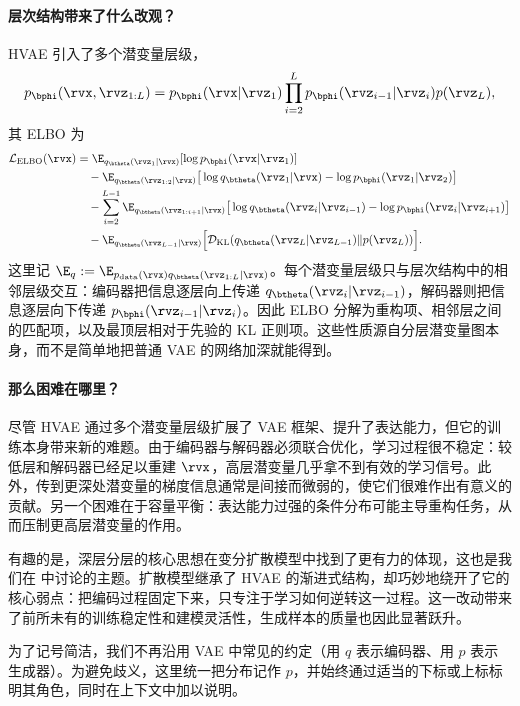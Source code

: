 \paragraph{层次结构带来了什么改观？}
HVAE 引入了多个潜变量层级，
\[
p_\bphi(\rvx,\rvz_{1:L})=p_\bphi(\rvx|\rvz_1)\prod_{i=2}^L p_\bphi(\rvz_{i-1}|\rvz_i) p(\rvz_L),
\]
其 ELBO 为
\begin{align*}
\mathcal L_{\mathrm{ELBO}}(\rvx)
&= \E_{q_\btheta(\rvz_1|\rvx)}[\log p_\bphi(\rvx|\rvz_1)]
\\
&\quad - \E_{q_\btheta(\rvz_{1:2}|\rvx)}
\big[\log q_\btheta(\rvz_1|\rvx)-\log p_\bphi(\rvz_1|\rvz_2)\big]
\\
&\quad - \sum_{i=2}^{L-1}
\E_{q_\btheta(\rvz_{1:i+1}|\rvx)}
\big[\log q_\btheta(\rvz_i|\rvz_{i-1})-\log p_\bphi(\rvz_i|\rvz_{i+1})\big]
\\
&\quad - \E_{q_\btheta(\rvz_{L-1}|\rvx)}
\Big[\mathcal{D}_{\mathrm{KL}}(q_\btheta(\rvz_L|\rvz_{L-1}) \| p(\rvz_L))\Big].
\end{align*}
这里记 $\E_q := \E_{p_{\mathrm{data}}(\rvx) q_{\btheta}(\rvz_{1:L}|\rvx)}$。每个潜变量层级只与层次结构中的相邻层级交互：编码器把信息逐层向上传递
$q_\btheta(\rvz_i|\rvz_{i-1})$，解码器则把信息逐层向下传递 $p_\bphi(\rvz_{i-1}|\rvz_i)$。因此 ELBO 分解为重构项、相邻层之间的匹配项，以及最顶层相对于先验的 KL 正则项。这些性质源自分层潜变量图本身，而不是简单地把普通 VAE 的网络加深就能得到。

\paragraph{那么困难在哪里？}
尽管 HVAE 通过多个潜变量层级扩展了 VAE 框架、提升了表达能力，但它的训练本身带来新的难题。由于编码器与解码器必须联合优化，学习过程很不稳定：较低层和解码器已经足以重建
$\rvx$，高层潜变量几乎拿不到有效的学习信号。此外，传到更深处潜变量的梯度信息通常是间接而微弱的，使它们很难作出有意义的贡献。另一个困难在于容量平衡：表达能力过强的条件分布可能主导重构任务，从而压制更高层潜变量的作用。


有趣的是，深层分层的核心思想在变分扩散模型中找到了更有力的体现，这也是我们在  中讨论的主题。扩散模型继承了 HVAE 的渐进式结构，却巧妙地绕开了它的核心弱点：把编码过程固定下来，只专注于学习如何逆转这一过程。这一改动带来了前所未有的训练稳定性和建模灵活性，生成样本的质量也因此显著跃升。


为了记号简洁，我们不再沿用 VAE 中常见的约定（用 $q$ 表示编码器、用 $p$ 表示生成器）。为避免歧义，这里统一把分布记作
$p$，并始终通过适当的下标或上标标明其角色，同时在上下文中加以说明。


